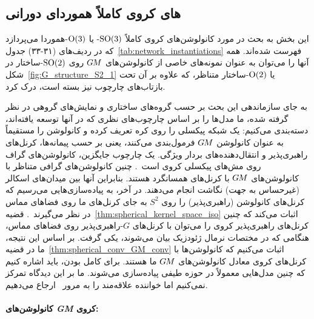 

\subsection{های کروی کاملاً هموردای دورانی}
\label{sec:spherical_CNNs_fully_equivariant}


این بخش به بحث در مورد کانولوشن‌های کروی کاملاً $\operatorname{SO}(3)$- یا $\operatorname{O}(3)$-هموردا می‌پردازد که در ردیف‌های (۳۱-۳۳) جدول~\ref{tab:network_instantiations} فهرست شده‌اند.
همه آنها را می‌توان به عنوان نمونه‌های خاصی از کانولوشن‌های $G\mkern-1.4muM$ روی $\operatorname{SO}(2)$-ساختار در شکل~\ref{fig:G_structure_S2_1} یا $\operatorname{O}(2)$-ساختار متناظر، که علاوه بر آن تحت بازتاب‌های چارچوب نیز بسته است، درک کرد.

به جای سازماندهی این بحث بر حسب گروه‌های ساختاری و نمایش‌های گروهی در نظر گرفته شده، ما مدل‌ها را بر اساس چارچوب‌های نظری که در آنها توسعه یافته‌اند، دسته‌بندی می‌کنیم:
\citet{kicanaoglu2019gaugeSphere} یک شبکه پیکسلی را روی کره تعریف کرده و کانولوشن را مستقیماً به عنوان کانولوشن $G\mkern-1.4muM$ فرمول‌بندی می‌کنند، یعنی بر حسب پیمانه‌ها، کرنل‌های راهبری‌پذیر و انتقال‌دهنده‌های بردار ویژگی.
یک چارچوب جایگزین، کانولوشن‌های گراف روی مش‌های پیکسلی کروی است~\cite{perraudin2018DeepSphere,yang2020rotation}.
چنین کانولوشن‌های گرافی متناظر با کانولوشن‌های $G\mkern-1.4muM$ با کرنل‌های همسانگرد هستند.
بنابراین آنها بین میدان‌های اسکالر (غیرحساس به جهت) نگاشت انجام می‌دهند.
در آخر، به پیاده‌سازی‌هایی می‌رسیم که کرنل‌های کانولوشن (راهبری‌پذیر) را روی $S^2$ به جای کرنل‌های ما روی فضاهای مماس در نظر می‌گیرند~\cite{esteves2018zonalSpherical,Cohen2018-S2CNN,kondor2018ClebschGordan,esteves2020spinweighted}.
قضیه~\ref{thm:spherical_kernel_space_iso} اثبات می‌کند که چنین کرنل‌های راهبری‌پذیر کروی را می‌توان با کرنل‌های $G$-راهبری‌پذیر روی فضاهای مماس، هنگامی که در مختصات نرمال ژئودزیک بیان می‌شوند، یکی گرفت.
بر اساس این نتیجه، ما در قضیه~\ref{thm:spherical_conv_GM_conv} اثبات می‌کنیم که کانولوشن‌ها با کرنل‌های کروی معادل کانولوشن‌های $G\mkern-1.4muM$ ما هستند.
برای کامل بودن، باید اشاره کنیم که چنین مدل‌هایی معمولاً در حوزه طیفی پیاده‌سازی می‌شوند.
ما بر این دیدگاه تمرکز نمی‌کنیم اما خواننده علاقه‌مند را به مرور~\citet{esteves2020theoretical} ارجاع می‌دهیم.


\paragraph{کانولوشن‌های \textit{GM} کروی:}

